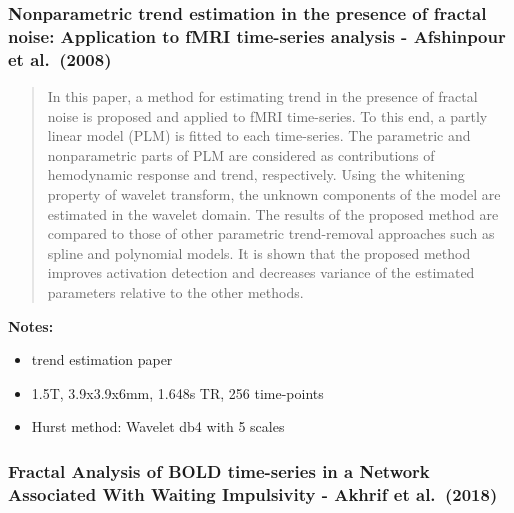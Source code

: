 \documentclass[
  sn-vancouver,
  Numbered,
  referee,
  lineno]{sn-jnl}
\providecommand{\tightlist}{%
  \setlength{\itemsep}{0pt}\setlength{\parskip}{0pt}}\usepackage{longtable,booktabs,array}
\begin{document}
\subsubsection{\texorpdfstring{Nonparametric trend estimation in the
presence of fractal noise: Application to fMRI time-series analysis -
Afshinpour et al.~(2008)
\citep{afshinpourNonparametricTrendEstimation2008}}{Nonparametric trend estimation in the presence of fractal noise: Application to fMRI time-series analysis - Afshinpour et al.~(2008) {[}@afshinpourNonparametricTrendEstimation2008{]}}}\label{nonparametric-trend-estimation-in-the-presence-of-fractal-noise-application-to-fmri-time-series-analysis---afshinpour-et-al.-2008-afshinpournonparametrictrendestimation2008}

\begin{quote}
In this paper, a method for estimating trend in the presence of fractal
noise is proposed and applied to fMRI time-series. To this end, a partly
linear model (PLM) is fitted to each time-series. The parametric and
nonparametric parts of PLM are considered as contributions of
hemodynamic response and trend, respectively. Using the whitening
property of wavelet transform, the unknown components of the model are
estimated in the wavelet domain. The results of the proposed method are
compared to those of other parametric trend-removal approaches such as
spline and polynomial models. It is shown that the proposed method
improves activation detection and decreases variance of the estimated
parameters relative to the other methods.
\end{quote}

\textbf{Notes:}

\begin{itemize}
\tightlist
\item
  trend estimation paper
\item
  1.5T, 3.9x3.9x6mm, 1.648s TR, 256 time-points
\item
  Hurst method: Wavelet db4 with 5 scales
\end{itemize}

\subsubsection{\texorpdfstring{Fractal Analysis of BOLD time-series in a
Network Associated With Waiting Impulsivity - Akhrif et al.~(2018)
\citep{akhrifFractalAnalysisBOLD2018}}{Fractal Analysis of BOLD time-series in a Network Associated With Waiting Impulsivity - Akhrif et al.~(2018) {[}@akhrifFractalAnalysisBOLD2018{]}}}\label{fractal-analysis-of-bold-time-series-in-a-network-associated-with-waiting-impulsivity---akhrif-et-al.-2018-akhriffractalanalysisbold2018}
\end{document}
